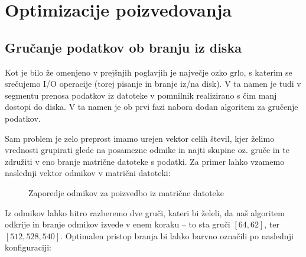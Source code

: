 \documentclass[a4paper,12pt,openright]{book}
\begin{document}
    \newpage
    \section{Optimizacije poizvedovanja}
        
        \subsection{Gručanje podatkov ob branju iz diska}
        
        Kot je bilo že omenjeno v prejšnjih poglavjih je največje ozko grlo, s katerim se srečujemo I/O operacije (torej pisanje in branje iz/na disk). V ta namen je tudi v segmentu prenosa podatkov iz datoteke v pomnilnik realizirano s čim manj dostopi do diska. V ta namen je ob prvi fazi nabora dodan algoritem za gručenje podatkov.

        Sam problem je zelo preprost imamo urejen vektor celih števil, kjer želimo vrednosti grupirati glede na posamezne odmike in najti skupine oz. gruče in te združiti v eno branje matrične datoteke s podatki. Za primer lahko vzamemo naslednji vektor odmikov v matrični datoteki:

\hfill \break
\begin{figure}[h]
\begin{center}
\caption{Zaporedje odmikov za poizvedbo iz matrične datoteke}
\end{center}
\end{figure}

\noindent Iz odmikov lahko hitro razberemo dve gruči, kateri bi želeli, da naš algoritem odkrije in branje odmikov izvede v enem koraku – to sta gruči $[64, 62]$, ter $[512, 528, 540]$. Optimalen pristop branja bi lahko barvno označili po naslednji konfiguraciji:
\end{document}
